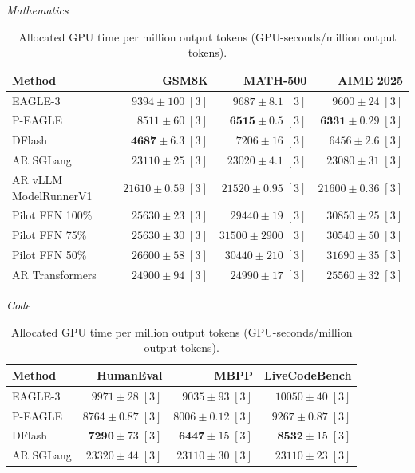 \begin{table}[!tp]
\centering
\small
\setlength{\tabcolsep}{3pt}
\caption{Allocated GPU time per million output tokens (GPU-seconds/million output tokens).}
\label{tab:gpu-time}
\textit{Mathematics}\par\smallskip
\begin{tabular}{@{}>{\raggedright\arraybackslash}p{3.7cm}rrr@{}}
\toprule
Method & GSM8K & MATH-500 & AIME 2025 \\
\midrule
EAGLE-3 & \(9394 \pm 100\;[3]\) & \(9687 \pm 8.1\;[3]\) & \(9600 \pm 24\;[3]\) \\
P-EAGLE & \(8511 \pm 60\;[3]\) & \(\mathbf{6515} \pm 0.5\;[3]\) & \(\mathbf{6331} \pm 0.29\;[3]\) \\
DFlash & \(\mathbf{4687} \pm 6.3\;[3]\) & \(7206 \pm 16\;[3]\) & \(6456 \pm 2.6\;[3]\) \\
AR \textperiodcentered{} SGLang & \(23110 \pm 25\;[3]\) & \(23020 \pm 4.1\;[3]\) & \(23080 \pm 31\;[3]\) \\
AR \textperiodcentered{} vLLM ModelRunnerV1 & \(21610 \pm 0.59\;[3]\) & \(21520 \pm 0.95\;[3]\) & \(21600 \pm 0.36\;[3]\) \\
Pilot FFN 100\% & \(25630 \pm 23\;[3]\) & \(29440 \pm 19\;[3]\) & \(30850 \pm 25\;[3]\) \\
Pilot FFN 75\% & \(25630 \pm 30\;[3]\) & \(31500 \pm 2900\;[3]\) & \(30540 \pm 50\;[3]\) \\
Pilot FFN 50\% & \(26600 \pm 58\;[3]\) & \(30440 \pm 210\;[3]\) & \(31690 \pm 35\;[3]\) \\
AR \textperiodcentered{} Transformers & \(24900 \pm 94\;[3]\) & \(24990 \pm 17\;[3]\) & \(25560 \pm 32\;[3]\) \\
\bottomrule
\end{tabular}
\par\medskip
\textit{Code}\par\smallskip
\begin{tabular}{@{}>{\raggedright\arraybackslash}p{3.7cm}rrr@{}}
\toprule
Method & HumanEval & MBPP & LiveCodeBench \\
\midrule
EAGLE-3 & \(9971 \pm 28\;[3]\) & \(9035 \pm 93\;[3]\) & \(10050 \pm 40\;[3]\) \\
P-EAGLE & \(8764 \pm 0.87\;[3]\) & \(8006 \pm 0.12\;[3]\) & \(9267 \pm 0.87\;[3]\) \\
DFlash & \(\mathbf{7290} \pm 73\;[3]\) & \(\mathbf{6447} \pm 15\;[3]\) & \(\mathbf{8532} \pm 15\;[3]\) \\
AR \textperiodcentered{} SGLang & \(23320 \pm 44\;[3]\) & \(23110 \pm 30\;[3]\) & \(23110 \pm 23\;[3]\) \\

\end{tabular}
\end{table}
